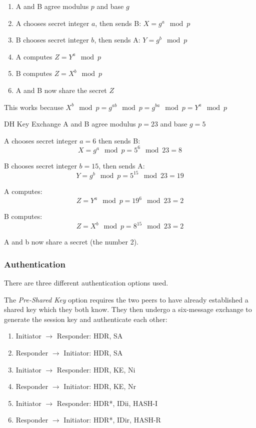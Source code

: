 \begin{enumerate}
    \item A and B agree modulus $p$ and base $g$
    \item A chooses secret integer $a$, then sends B: $X=g^a \mod p$
    \item B chooses secret integer $b$, then sends A: $Y=g^b \mod p$
    \item A computes $Z=Y^a \mod p$
    \item B computes $Z=X^b \mod p$
    \item A and B now share the secret $Z$
\end{enumerate}

This works because $X^b \mod p = g^{ab} \mod p = g^{ba} \mod p = Y^a \mod p$

\begin{example}{DH Key Exchange}
A and B agree modulus $p=23$ and base $g=5$

A chooses secret integer $a=6$ then sends B:
\[X = g^a \mod p = 5^6 \mod 23 = 8\]

B chooses secret integer $b=15$, then sends A:
\[Y=g^b \mod p = 5^{15} \mod 23 = 19\]

A computes:
\[Z=Y^a \mod p = 19^6 \mod 23 = 2\]

B computes:
\[Z=X^b \mod p = 8^{15} \mod 23 = 2\]

A and b now share a secret (the number 2).
\end{example}

\subsubsection{Authentication}
There are three different authentication options used.

The \textit{Pre-Shared Key} option requires the two peers to have already established a shared key which they both know. They then undergo a six-message exchange to generate the session key and authenticate each other:
\begin{enumerate}
    \item Initiator $\rightarrow$ Responder: HDR, SA
    \item Responder $\rightarrow$ Initiator: HDR, SA
    \item Initiator $\rightarrow$ Responder: HDR, KE, Ni
    \item Responder $\rightarrow$ Initiator: HDR, KE, Nr
    \item Initiator $\rightarrow$ Responder: HDR*, IDii, HASH-I
    \item Responder $\rightarrow$ Initiator: HDR*, IDir, HASH-R
\end{enumerate}

